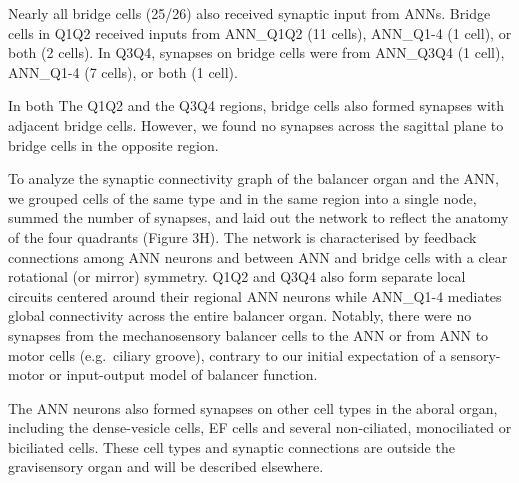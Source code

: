 \documentclass[
  11pt,
]{article}
\begin{document}
Nearly all bridge cells (25/26) also received synaptic input from ANNs.
Bridge cells in Q1Q2 received inputs from ANN\_Q1Q2 (11 cells),
ANN\_Q1-4 (1 cell), or both (2 cells). In Q3Q4, synapses on bridge cells
were from ANN\_Q3Q4 (1 cell), ANN\_Q1-4 (7 cells), or both (1 cell).

In both The Q1Q2 and the Q3Q4 regions, bridge cells also formed synapses
with adjacent bridge cells. However, we found no synapses across the
sagittal plane to bridge cells in the opposite region.

To analyze the synaptic connectivity graph of the balancer organ and the
ANN, we grouped cells of the same type and in the same region into a
single node, summed the number of synapses, and laid out the network to
reflect the anatomy of the four quadrants (Figure 3H). The network is
characterised by feedback connections among ANN neurons and between ANN
and bridge cells with a clear rotational (or mirror) symmetry. Q1Q2 and
Q3Q4 also form separate local circuits centered around their regional
ANN neurons while ANN\_Q1-4 mediates global connectivity across the
entire balancer organ. Notably, there were no synapses from the
mechanosensory balancer cells to the ANN or from ANN to motor cells
(e.g.~ciliary groove), contrary to our initial expectation of a
sensory-motor or input-output model of balancer function.

The ANN neurons also formed synapses on other cell types in the aboral
organ, including the dense-vesicle cells, EF cells and several
non-ciliated, monociliated or biciliated cells. These cell types and
synaptic connections are outside the gravisensory organ and will be
described elsewhere.
\end{document}
